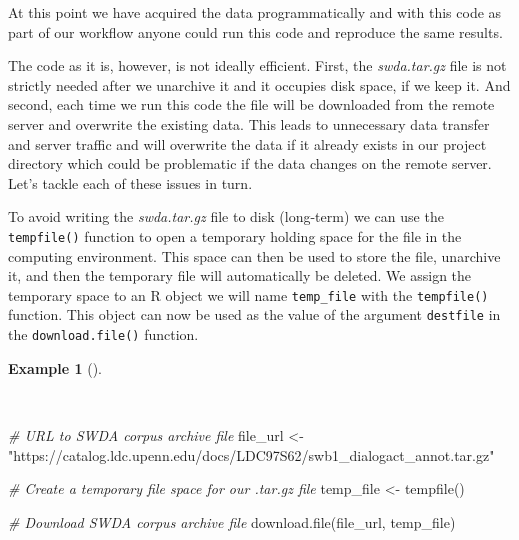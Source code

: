 \documentclass[
  letterpaper,
]{latex/krantz}
\newenvironment{Shaded}{\begin{snugshade}}{\end{snugshade}}
\newcommand{\CommentTok}[1]{\textcolor[rgb]{0.00,0.00,0.00}{\textit{#1}}}
\newcommand{\FunctionTok}[1]{\textcolor[rgb]{0.00,0.00,0.00}{#1}}
\newcommand{\NormalTok}[1]{\textcolor[rgb]{0.00,0.00,0.00}{#1}}
\newcommand{\OtherTok}[1]{\textcolor[rgb]{0.00,0.00,0.00}{#1}}
\newcommand{\StringTok}[1]{\textcolor[rgb]{0.00,0.00,0.00}{#1}}
\theoremstyle{definition}
\newtheorem{example}{Example}[chapter]
\theoremstyle{remark}
\begin{document}
At this point we have acquired the data programmatically and with this
code as part of our workflow anyone could run this code and reproduce
the same results.

The code as it is, however, is not ideally efficient. First, the
\emph{swda.tar.gz} file is not strictly needed after we unarchive it and
it occupies disk space, if we keep it. And second, each time we run this
code the file will be downloaded from the remote server and overwrite
the existing data. This leads to unnecessary data transfer and server
traffic and will overwrite the data if it already exists in our project
directory which could be problematic if the data changes on the remote
server. Let's tackle each of these issues in turn.

To avoid writing the \emph{swda.tar.gz} file to disk (long-term) we can
use the \texttt{tempfile()} function to open a temporary holding space
for the file in the computing environment. This space can then be used
to store the file, unarchive it, and then the temporary file will
automatically be deleted. We assign the temporary space to an R object
we will name \texttt{temp\_file} with the \texttt{tempfile()} function.
This object can now be used as the value of the argument
\texttt{destfile} in the \texttt{download.file()} function.

\begin{example}[]\protect\hypertarget{exm-acquire-swda-temp-file}{}\label{exm-acquire-swda-temp-file}

~

\begin{Shaded}
\begin{Highlighting}[]
\CommentTok{\# URL to SWDA corpus archive file}
\NormalTok{file\_url }\OtherTok{\textless{}{-}}
  \StringTok{"https://catalog.ldc.upenn.edu/docs/LDC97S62/swb1\_dialogact\_annot.tar.gz"}

\CommentTok{\# Create a temporary file space for our .tar.gz file}
\NormalTok{temp\_file }\OtherTok{\textless{}{-}} \FunctionTok{tempfile}\NormalTok{()}

\CommentTok{\# Download SWDA corpus archive file}
\FunctionTok{download.file}\NormalTok{(file\_url, temp\_file)}
\end{Highlighting}
\end{Shaded}

\end{example}
\end{document}
